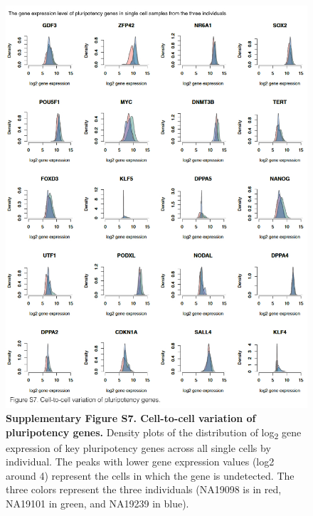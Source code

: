 \begin{figure}[htbp]
\centering
\includegraphics[width=5in]{img/ch04/Figure12.jpeg}
\caption{\textbf{Supplementary Figure S7. Cell-to-cell variation of
pluripotency genes.} Density plots of the distribution of
log\textsubscript{2} gene expression of key pluripotency genes across
all single cells by individual. The peaks with lower gene expression
values (log2 around 4) represent the cells in which the gene is
undetected. The three colors represent the three individuals (NA19098 is
in red, NA19101 in green, and NA19239 in blue).}
\end{figure}

